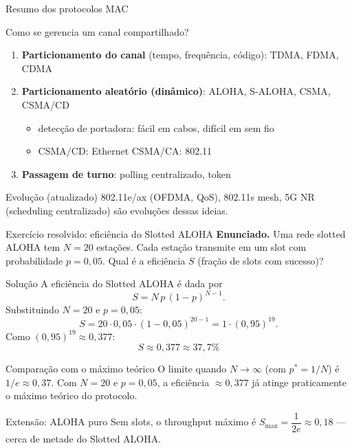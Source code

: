 \documentclass[aspectratio=169,11pt]{beamer}
\begin{document}
\begin{frame}{Resumo dos protocolos MAC}
  \begin{block}{Como se gerencia um canal compartilhado?}
    \begin{enumerate}
      \item \textbf{Particionamento do canal} (tempo, frequência, código): TDMA, FDMA, CDMA
      \item \textbf{Particionamento aleatório (dinâmico)}: ALOHA, S-ALOHA, CSMA, CSMA/CD
        \begin{itemize}
          \item detecção de portadora: fácil em cabos, difícil em sem fio
          \item CSMA/CD: Ethernet \quad CSMA/CA: 802.11
        \end{itemize}
      \item \textbf{Passagem de turno}: polling centralizado, token
    \end{enumerate}
  \end{block}
  \begin{alertblock}{Evolução (atualizado)}
    802.11e/ax (OFDMA, QoS), 802.11s mesh, 5G NR (scheduling centralizado) são evoluções dessas ideias.
  \end{alertblock}
\end{frame}

\begin{frame}{Exercício resolvido: eficiência do Slotted ALOHA}
  \textbf{Enunciado.} Uma rede slotted ALOHA tem $N=20$ estações. Cada estação transmite em um slot com probabilidade $p=0{,}05$. Qual é a eficiência $S$ (fração de slots com sucesso)?
  \begin{block}{Solução}
    A eficiência do Slotted ALOHA é dada por
    \[
      S = N\,p\,(1-p)^{N-1}.
    \]
    Substituindo $N=20$ e $p=0{,}05$:
    \[
      S = 20 \cdot 0{,}05 \cdot (1-0{,}05)^{20-1} = 1 \cdot (0{,}95)^{19}.
    \]
    Como $(0{,}95)^{19} \approx 0{,}377$:
    \[
      \boxed{S \approx 0{,}377 \approx 37{,}7\%}
    \]
  \end{block}
  \begin{alertblock}{Comparação com o máximo teórico}
    O limite quando $N\to\infty$ (com $p^*=1/N$) é $1/e \approx 0{,}37$. Com $N=20$ e $p=0{,}05$, a eficiência $\approx 0{,}377$ já atinge praticamente o máximo teórico do protocolo.
  \end{alertblock}
  \begin{exampleblock}{Extensão: ALOHA puro}
    Sem slots, o throughput máximo é $S_{\max} = \dfrac{1}{2e} \approx 0{,}18$ --- cerca de metade do Slotted ALOHA.
  \end{exampleblock}
\end{frame}
\end{document}
